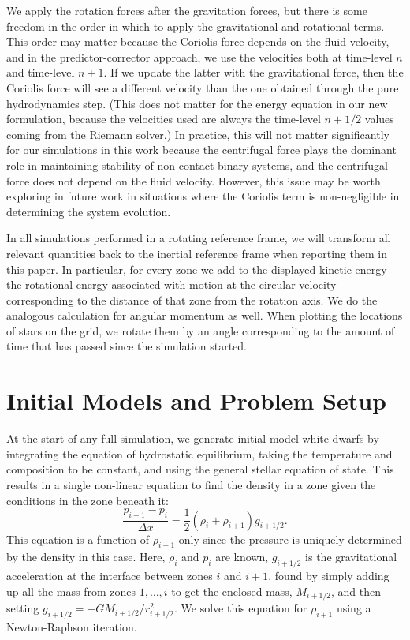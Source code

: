 \documentclass[iop]{emulateapj}
\begin{document}
We apply the rotation forces after the gravitation forces, but 
there is some freedom in the order in which to apply the gravitational and rotational terms.
This order may matter because the Coriolis force depends on the fluid velocity, and 
in the predictor-corrector approach, we use the velocities both at 
time-level $n$ and time-level $n+1$. If we update the latter with the gravitational force, 
then the Coriolis force will see a different velocity than the one obtained through the 
pure hydrodynamics step. (This does not matter for the energy equation in our new formulation,
because the velocities used are always the time-level $n+1/2$ values coming from the Riemann solver.)
In practice, this will not matter significantly for our simulations in this work 
because the centrifugal force plays the dominant role in maintaining stability of non-contact 
binary systems, and the centrifugal force does not depend on the fluid velocity.
However, this issue may be worth exploring in future work in situations where the Coriolis 
term is non-negligible in determining the system evolution.

In all simulations performed in a rotating reference frame, we will transform all relevant
quantities back to the inertial reference frame when reporting them in this paper. In particular,
for every zone we add to the displayed kinetic energy the rotational energy associated with motion 
at the circular velocity corresponding to the distance of that zone from the rotation axis.
We do the analogous calculation for angular momentum as well. When plotting the locations of 
stars on the grid, we rotate them by an angle corresponding to the amount of time that has 
passed since the simulation started.


\section{Initial Models and Problem Setup}
\label{sec:initial_models}

At the start of any full simulation, we generate initial model white
dwarfs by integrating the equation of hydrostatic equilibrium, taking
the temperature and composition to be constant, and using the general
stellar equation of state.  This results in a single non-linear
equation to find the density in a zone given the conditions in the
zone beneath it:
\begin{equation}
\frac{p_{i+1} - p_i}{\Delta x} = \frac{1}{2} (\rho_i + \rho_{i+1}) g_{i+1/2}.
\end{equation}
This equation is a function of $\rho_{i+1}$ only since the pressure is
uniquely determined by the density in this case. Here, $\rho_i$ and $p_i$
are known, $g_{i+1/2}$ is the gravitational acceleration at the
interface between zones $i$ and $i+1$, found by simply adding up all
the mass from zones $1, \ldots, i$ to get the enclosed mass,
$M_{i+1/2}$, and then setting $g_{i+1/2} =
-GM_{i+1/2}/r_{i+1/2}^2$. We solve this equation for $\rho_{i+1}$
using a Newton-Raphson iteration.
\end{document}
